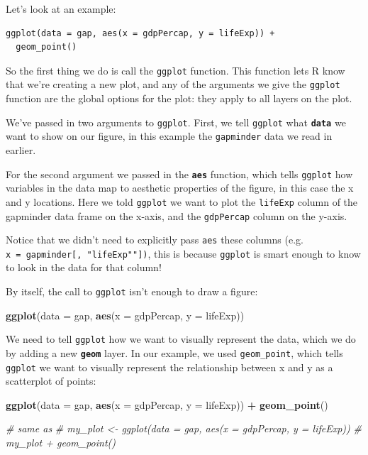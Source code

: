 \documentclass[]{book}
\newenvironment{Shaded}{\begin{snugshade}}{\end{snugshade}}
\newcommand{\CommentTok}[1]{\textcolor[rgb]{0.56,0.35,0.01}{\textit{#1}}}
\newcommand{\DataTypeTok}[1]{\textcolor[rgb]{0.13,0.29,0.53}{#1}}
\newcommand{\KeywordTok}[1]{\textcolor[rgb]{0.13,0.29,0.53}{\textbf{#1}}}
\newcommand{\NormalTok}[1]{#1}
\newcommand{\OperatorTok}[1]{\textcolor[rgb]{0.81,0.36,0.00}{\textbf{#1}}}
\newcommand{\StringTok}[1]{\textcolor[rgb]{0.31,0.60,0.02}{#1}}
\begin{document}
Let's look at an example:

\begin{verbatim}
ggplot(data = gap, aes(x = gdpPercap, y = lifeExp)) +
  geom_point()
\end{verbatim}

So the first thing we do is call the \texttt{ggplot} function. This function lets R know that we're creating a new plot, and any of the arguments we give the \texttt{ggplot} function are the global options for the plot: they apply to all layers on the plot.

We've passed in two arguments to \texttt{ggplot}. First, we tell \texttt{ggplot} what \textbf{\texttt{data}} we want to show on our figure, in this example the \texttt{gapminder} data we read in earlier.

For the second argument we passed in the \textbf{\texttt{aes}} function, which tells \texttt{ggplot} how variables in the data map to aesthetic properties of the figure, in this case the x and y locations. Here we told \texttt{ggplot} we want to plot the \texttt{lifeExp} column of the gapminder data frame on the x-axis, and the \texttt{gdpPercap} column on the y-axis.

Notice that we didn't need to explicitly pass \texttt{aes} these columns (e.g. \texttt{x\ =\ gapminder{[},\ "lifeExp""{]})}, this is because \texttt{ggplot} is smart enough to know to look in the data for that column!

By itself, the call to \texttt{ggplot} isn't enough to draw a figure:

\begin{Shaded}
\begin{Highlighting}[]
\KeywordTok{ggplot}\NormalTok{(}\DataTypeTok{data =}\NormalTok{ gap, }\KeywordTok{aes}\NormalTok{(}\DataTypeTok{x =}\NormalTok{ gdpPercap, }\DataTypeTok{y =}\NormalTok{ lifeExp))}
\end{Highlighting}
\end{Shaded}

We need to tell \texttt{ggplot} how we want to visually represent the data, which we do by adding a new \textbf{\texttt{geom}} layer. In our example, we used \texttt{geom\_point}, which tells \texttt{ggplot} we want to visually represent the relationship between x and y as a scatterplot of points:

\begin{Shaded}
\begin{Highlighting}[]
\KeywordTok{ggplot}\NormalTok{(}\DataTypeTok{data =}\NormalTok{ gap, }\KeywordTok{aes}\NormalTok{(}\DataTypeTok{x =}\NormalTok{ gdpPercap, }\DataTypeTok{y =}\NormalTok{ lifeExp)) }\OperatorTok{+}\StringTok{ }
\StringTok{  }\KeywordTok{geom_point}\NormalTok{()}

\CommentTok{# same as}
\CommentTok{# my_plot <- ggplot(data = gap, aes(x = gdpPercap, y = lifeExp))}
\CommentTok{# my_plot + geom_point()}
\end{Highlighting}
\end{Shaded}
\end{document}
